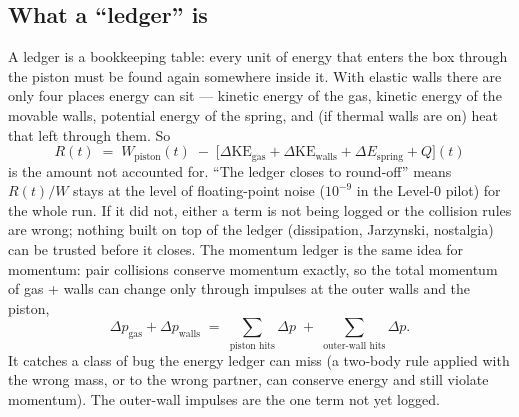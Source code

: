 \documentclass[11pt,a4paper]{article}
\begin{document}
\subsection{What a ``ledger'' is}
A ledger is a bookkeeping table: every unit of energy that enters the box through the piston must be found again somewhere inside it. With elastic walls there are only four places energy can sit --- kinetic energy of the gas, kinetic energy of the movable walls, potential energy of the spring, and (if thermal walls are on) heat that left through them. So
\begin{equation}
R(t) \;=\; W_{\mathrm{piston}}(t) \;-\; \Big[\Delta\mathrm{KE}_{\mathrm{gas}} + \Delta\mathrm{KE}_{\mathrm{walls}} + \Delta E_{\mathrm{spring}} + Q\Big](t)
\end{equation}
is the amount not accounted for. ``The ledger closes to round-off'' means $R(t)/W$ stays at the level of floating-point noise ($10^{-9}$ in the Level-0 pilot) for the whole run. If it did not, either a term is not being logged or the collision rules are wrong; nothing built on top of the ledger (dissipation, Jarzynski, nostalgia) can be trusted before it closes. The momentum ledger is the same idea for momentum: pair collisions conserve momentum exactly, so the total momentum of gas + walls can change only through impulses at the outer walls and the piston,
\begin{equation}
\Delta p_{\mathrm{gas}} + \Delta p_{\mathrm{walls}} \;=\; \sum_{\text{piston hits}} \Delta p \;+\; \sum_{\text{outer-wall hits}} \Delta p .
\end{equation}
It catches a class of bug the energy ledger can miss (a two-body rule applied with the wrong mass, or to the wrong partner, can conserve energy and still violate momentum). The outer-wall impulses are the one term not yet logged.
\end{document}
